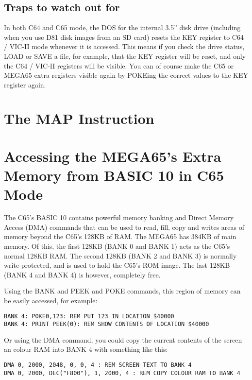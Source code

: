 \subsection{Traps to watch out for}

In both C64 and C65 mode, the DOS for the internal 3.5'' disk drive (including when you use D81 disk images from
an SD card) resets the KEY register to C64 / VIC-II mode whenever it is accessed. This means if you check the drive
status, LOAD or SAVE a file, for example, that the KEY register will be reset, and only the C64 / VIC-II registers
will be visible. You can of course make the C65 or MEGA65 extra registers visible again by POKEing the correct values
to the KEY register again.

\section{The MAP Instruction}

\section{Accessing the MEGA65's Extra Memory from BASIC 10 in C65 Mode}

The C65's BASIC 10 contains powerful memory banking and Direct Memory Access (DMA) commands that can be used to read,
fill, copy and writes areas of memory beyond the C65's 128KB of RAM.  The MEGA65 has 384KB of main memory. Of this,
the first 128KB (BANK 0 and BANK 1) acts as the C65's normal 128KB RAM. The second 128KB (BANK 2 and BANK 3) is normally
write-protected, and is used to hold the C65's ROM image.  The last 128KB (BANK 4 and BANK 4) is however, completely free.

Using the BANK and PEEK and POKE commands, this region of memory can be easily accessed, for example:

\begin{tcolorbox}[colback=black,coltext=white]
\verbatimfont{\codefont}
\begin{verbatim}
BANK 4: POKE0,123: REM PUT 123 IN LOCATION $40000
BANK 4: PRINT PEEK(0): REM SHOW CONTENTS OF LOCATION $40000
\end{verbatim}
\end{tcolorbox}

Or using the DMA command, you could copy the current contents of the screen an colour RAM into BANK 4 with something like this:

\begin{tcolorbox}[colback=black,coltext=white]
\verbatimfont{\codefont}
\begin{verbatim}
DMA 0, 2000, 2048, 0, 0, 4 : REM SCREEN TEXT TO BANK 4
DMA 0, 2000, DEC("F800"), 1, 2000, 4 : REM COPY COLOUR RAM TO BANK 4
\end{verbatim}
\end{tcolorbox}

